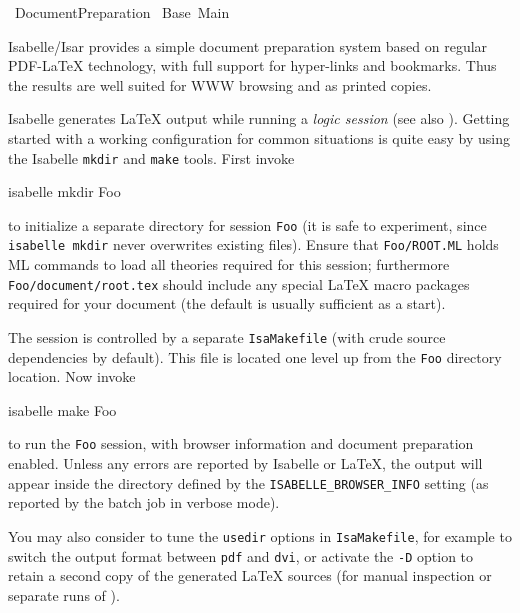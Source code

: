 %
\begin{isabellebody}%
\def\isabellecontext{Document{\isaliteral{5F}{\isacharunderscore}}Preparation}%
%
\isadelimtheory
%
\endisadelimtheory
%
\isatagtheory
{}\isamarkupfalse%
\ Document{}Preparation\isanewline
{}\ Base\ Main\isanewline
{}%
\endisatagtheory
{\isafoldtheory}%
%
\isadelimtheory
%
\endisadelimtheory
%
\isamarkuptrue%
%
\begin{isamarkuptext}%
Isabelle/Isar provides a simple document preparation system
  based on regular {PDF-\LaTeX} technology, with full support for
  hyper-links and bookmarks.  Thus the results are well suited for WWW
  browsing and as printed copies.

  \medskip Isabelle generates {\LaTeX} output while running a
  \emph{logic session} (see also \cite{isabelle-sys}).  Getting
  started with a working configuration for common situations is quite
  easy by using the Isabelle \verb|mkdir| and \verb|make|
  tools.  First invoke
\begin{ttbox}
  isabelle mkdir Foo
\end{ttbox}
  to initialize a separate directory for session \verb|Foo| (it
  is safe to experiment, since \verb|isabelle mkdir| never
  overwrites existing files).  Ensure that \verb|Foo/ROOT.ML|
  holds ML commands to load all theories required for this session;
  furthermore \verb|Foo/document/root.tex| should include any
  special {\LaTeX} macro packages required for your document (the
  default is usually sufficient as a start).

  The session is controlled by a separate \verb|IsaMakefile|
  (with crude source dependencies by default).  This file is located
  one level up from the \verb|Foo| directory location.  Now
  invoke
\begin{ttbox}
  isabelle make Foo
\end{ttbox}
  to run the \verb|Foo| session, with browser information and
  document preparation enabled.  Unless any errors are reported by
  Isabelle or {\LaTeX}, the output will appear inside the directory
  defined by the \verb|ISABELLE_BROWSER_INFO| setting (as
  reported by the batch job in verbose mode).

  \medskip You may also consider to tune the \verb|usedir|
  options in \verb|IsaMakefile|, for example to switch the output
  format between \verb|pdf| and \verb|dvi|, or activate the
  \verb|-D| option to retain a second copy of the generated
  {\LaTeX} sources (for manual inspection or separate runs of
  \hyperlink{executable.latex}{\mbox{}}).


\end{isamarkuptext}
\end{isabellebody}
